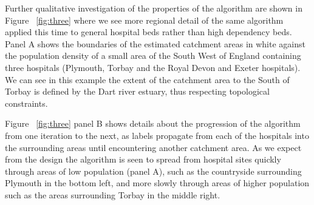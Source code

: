 \documentclass[twocolumn]{bmcart}%
\begin{document}


Further qualitative investigation of the properties of the algorithm are shown in Figure ~\ref{fig:three} where we see 
more regional detail of the same algorithm applied this time to general hospital beds rather than high dependency beds. 
Panel A shows the boundaries of the estimated catchment areas in white against the population density of a small area 
of the South West of England containing three hospitals (Plymouth, Torbay and the Royal Devon and Exeter hospitals). We 
can see in this example the extent of the catchment area to the South of Torbay is defined by the Dart river estuary, 
thus respecting topological constraints. 

Figure ~\ref{fig:three} panel B shows details about the progression of the algorithm from one iteration to the next, as 
labels propagate from each of the hospitals into the surrounding areas until encountering another catchment area. As we 
expect from the design the algorithm is seen to spread from hospital sites quickly through areas of low population 
(panel A), such as the countryside surrounding Plymouth in the bottom left, and more slowly through areas of higher 
population such as the areas surrounding Torbay in the middle right. 

\end{document}
